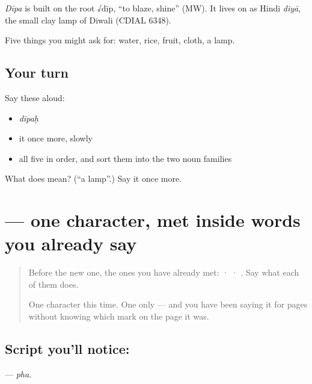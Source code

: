 \begin{cousinweb}
\emph{Dīpa} is built on the root √dīp, \textquotedblleft{}to blaze, shine\textquotedblright{} (MW). It lives on as Hindi \emph{diyā}, the small clay lamp of Diwali (CDIAL 6348).
\end{cousinweb}

\begin{grammarlens}[title={What you've built}]
Five things you might ask for: water, rice, fruit, cloth, a lamp.
\end{grammarlens}

\subsection*{Your turn}
Say these aloud:

\begin{itemize}
\raggedright
  \item \emph{dīpaḥ}
  \item it once more, slowly
  \item all five in order, and sort them into the two noun families
\end{itemize}

\begin{tcolorbox}[breakable,colback=teal!4,colframe=teal!35!black,title={Before you move on}]
What does  mean? (\textquotedblleft{}a lamp\textquotedblright{}.) Say it once more.
\end{tcolorbox}
\section[\texorpdfstring{\sk{फ} (pha)}{फ (pha)}]{ — one character, met inside words you already say}

\label{lesson:SA-S122-letter-pha}



\begin{quote}
Before the new one, the ones you have already met:  ·  · . Say what each of them does.

One character this time. One only — and you have been saying it for pages without knowing which mark on the page it was.
\end{quote}

\subsection*{Script you'll notice: }
\textbf{} — \emph{pha}.

